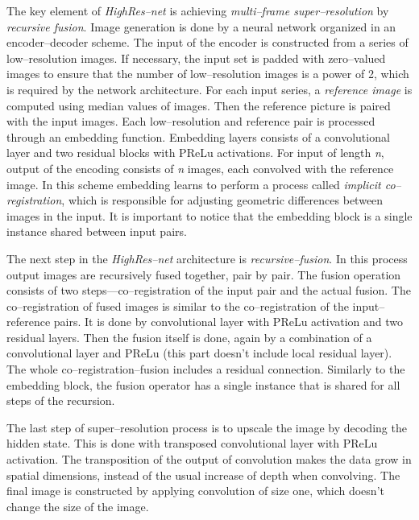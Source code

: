 The key element of \textit{HighRes--net} is achieving \textit{multi--frame super--resolution} by \textit{recursive fusion}.
Image generation is done by a neural network organized in an encoder--decoder scheme.
The input of the encoder is constructed from a series of low--resolution images.
If necessary, the input set is padded with zero--valued images to ensure that the number of low--resolution images is a power of 2, which is required by the network architecture.
For each input series, a \textit{reference image} is computed using median values of images.
Then the reference picture is paired with the input images.
Each low--resolution and reference pair is processed through an embedding function.
Embedding layers consists of a convolutional layer and two residual blocks with PReLu activations.
For input of length \textit{n}, output of the encoding consists of \textit{n} images, each convolved with the reference image.
In this scheme embedding learns to perform a process called \textit{implicit co--registration}, which is responsible for adjusting geometric differences between images in the input.
It is important to notice that the embedding block is a single instance shared between input pairs.

The next step in the \textit{HighRes--net} architecture is \textit{recursive--fusion}.
In this process output images are recursively fused together, pair by pair.
The fusion operation consists of two steps---co--registration of the input pair and the actual fusion.
The co--registration of fused images is similar to the co--registration of the input--reference pairs.
It is done by convolutional layer with PReLu activation and two residual layers.
Then the fusion itself is done, again by a combination of a convolutional layer and PReLu (this part doesn't include local residual layer).
The whole co--registration--fusion includes a residual connection.
Similarly to the embedding block, the fusion operator has a single instance that is shared for all steps of the recursion.

The last step of super--resolution process is to upscale the image by decoding the hidden state.
This is done with transposed convolutional layer with PReLu activation.
The transposition of the output of convolution makes the data grow in spatial dimensions, instead of the usual increase of depth when convolving.
The final image is constructed by applying convolution of size one, which doesn't change the size of the image.

